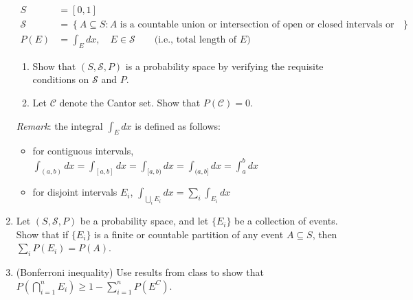 \documentclass[
  letterpaper,
  DIV=11,
  numbers=noendperiod]{scrartcl}
\providecommand{\tightlist}{%
  \setlength{\itemsep}{0pt}\setlength{\parskip}{0pt}}\usepackage{longtable,booktabs,array}
\begin{document}
\begin{enumerate}
  \begin{align*}
  S &= [0, 1] \\
  \mathcal{S} &= \left\{A \subseteq S: A \text{ is a countable union or intersection of open or closed intervals or their complements}\right\} \\
  P(E) &= \int_E dx,\quad E\in\mathcal{S} \qquad\text{(i.e., total length of $E$)}
  \end{align*}
  

  \begin{enumerate}
  \def\labelenumii{\roman{enumii}.}
  \tightlist
  \item
    Show that \((S, \mathcal{S}, P)\) is a probability space by
    verifying the requisite conditions on \(\mathcal{S}\) and \(P\).
  \item
    Let \(\mathcal{C}\) denote the Cantor set. Show that
    \(P(\mathcal{C}) = 0\).
  \end{enumerate}

  \emph{Remark}: the integral \(\int_E dx\) is defined as follows:

  \begin{itemize}
  \item
    for contiguous intervals,
    \(\int_{(a, b)} dx = \int_{[a, b]} dx = \int_{[a, b)} dx = \int_{(a, b]} dx = \int_a^b dx\)
  \item
    for disjoint intervals \(E_i\),
    \(\int_{\bigcup_i E_i} dx = \sum_i \int_{E_i} dx\)
  \end{itemize}
\newpage
\item
  Let \((S, \mathcal{S}, P)\) be a probability space, and let
  \(\{E_i\}\) be a collection of events. Show that if \(\{E_i\}\) is a
  finite or countable partition of any event \(A \subseteq S\), then
  \(\sum_i P(E_i) = P(A)\).
\newpage
\item
  (Bonferroni inequality) Use results from class to show that
  \(P\left(\bigcap_{i = 1}^n E_i\right) \geq 1 - \sum_{i = 1}^n P\left(E^C\right)\).
\end{enumerate}
\end{document}
